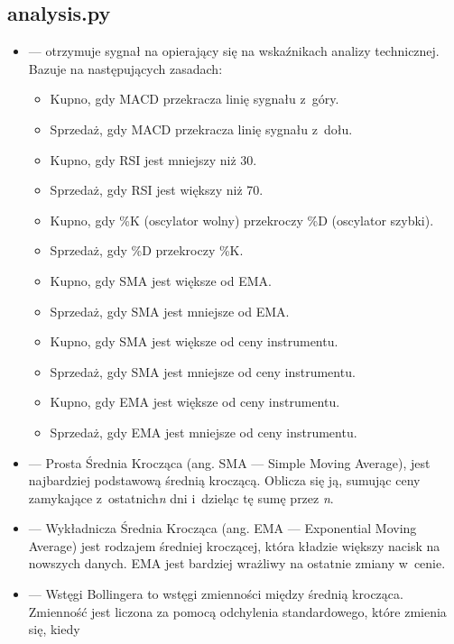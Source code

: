 \documentclass[12pt]{article}
\begin{document}
    \subsection{analysis.py}\label{subsec:wskazniki}
    \begin{itemize}
        \item {} — otrzymuje sygnał na opierający się na wskaźnikach analizy technicznej.
        Bazuje na następujących zasadach:
        \begin{itemize}
            \item Kupno, gdy MACD przekracza linię sygnału z~góry.
            \item Sprzedaż, gdy MACD przekracza linię sygnału z~dołu.
            \item Kupno, gdy RSI jest mniejszy niż 30.
            \item Sprzedaż, gdy RSI jest większy niż 70.
            \item Kupno, gdy \%K (oscylator wolny) przekroczy \%D (oscylator szybki).
            \item Sprzedaż, gdy \%D przekroczy \%K\@.
            \item Kupno, gdy SMA jest większe od EMA\@.
            \item Sprzedaż, gdy SMA jest mniejsze od EMA\@.
            \item Kupno, gdy SMA jest większe od ceny instrumentu.
            \item Sprzedaż, gdy SMA jest mniejsze od ceny instrumentu.
            \item Kupno, gdy EMA jest większe od ceny instrumentu.
            \item Sprzedaż, gdy EMA jest mniejsze od ceny instrumentu.
        \end{itemize}
        \item {} — Prosta Średnia Krocząca (ang. SMA — Simple Moving Average), jest
        najbardziej podstawową średnią kroczącą.
        Oblicza się ją, sumując ceny zamykające z~ostatnich\textit{n} dni i~dzieląc tę sumę przez \textit{n}.
        \item {} — Wykładnicza Średnia Krocząca (ang. EMA — Exponential Moving Average) jest rodzajem
        średniej kroczącej, która kładzie większy nacisk na nowszych danych.
        EMA jest bardziej wrażliwy na ostatnie zmiany w~cenie.
        \item {} — Wstęgi Bollingera to wstęgi zmienności między średnią krocząca.
        Zmienność jest liczona za pomocą odchylenia standardowego, które zmienia się, kiedy

\end{itemize}
\end{document}
